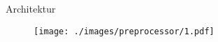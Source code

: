\begin{frame}{Architektur}
    \begin{figure}
    	\centering
    	\texttt{[image: ./images/preprocessor/1.pdf]}
    \end{figure}
\end{frame}
